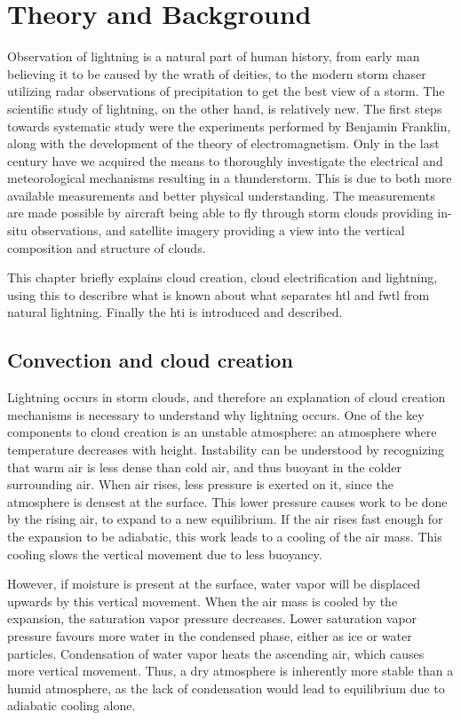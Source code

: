 \setcounter{chapter}{1} 

\chapter{Theory and Background}\label{ch:lightning}
Observation of lightning is a  natural part of human history, from early man believing it to be caused by the wrath of deities, to the modern storm chaser utilizing radar observations of precipitation to get the best view of a storm. The scientific study of lightning, on the other hand, is relatively new. The first steps towards systematic study were the experiments performed by Benjamin Franklin, along with the development of the theory of electromagnetism. Only in the last century have we acquired the means to thoroughly investigate the electrical and meteorological mechanisms resulting in a thunderstorm. This is due to both more available measurements and better physical understanding. The measurements are made possible by aircraft being able to fly through storm clouds providing in-situ observations, and satellite imagery providing a view into the vertical composition and structure of clouds.

This chapter briefly explains cloud creation, cloud electrification and lightning, using this to describre what is known about what separates \acrlong{htl} and \acrlong{fwtl} from natural lightning. Finally the \acrfull{hti} is introduced and described.

\section{Convection and cloud creation}

Lightning occurs in storm clouds, and therefore an explanation of cloud creation mechanisms is necessary to understand why lightning occurs. One of the key components to cloud creation is an unstable atmosphere: an atmosphere where temperature decreases with height. Instability can be understood by recognizing that warm air is less dense than cold air, and thus buoyant in the colder surrounding air. When air rises, less pressure is exerted on it, since the atmosphere is densest at the surface. This lower pressure causes work to be done by the rising air, to expand to a new equilibrium. If the air rises fast enough for the expansion to be adiabatic, this work leads to a cooling of the air mass. This cooling slows the vertical movement due to less buoyancy.

However, if moisture is present at the surface, water vapor will be displaced upwards by this vertical movement. When the air mass is cooled by the expansion, the saturation vapor pressure decreases. Lower saturation vapor pressure favours more water in the condensed phase, either as ice or water particles. Condensation of water vapor heats the ascending air, which causes more vertical movement. Thus, a dry atmosphere is inherently more stable than a humid atmosphere, as the lack of condensation would lead to equilibrium due to adiabatic cooling alone.

